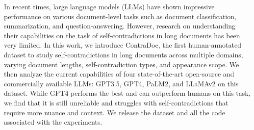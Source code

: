 In recent times, large language models (LLMs) have shown impressive performance on various document-level tasks such as document classification, summarization, and question-answering. However, research on understanding their capabilities on the task of self-contradictions in long documents has been very limited. In this work, we introduce ContraDoc, the first human-annotated dataset to study self-contradictions in long documents across multiple domains, varying document lengths, self-contradiction types, and appearance scope. We then analyze the current capabilities of four state-of-the-art open-source and commercially available LLMs: GPT3.5, GPT4, PaLM2, and LLaMAv2 on this dataset.  While GPT4 performs the best and can outperform humans on this task, we find that it is still unreliable and struggles with self-contradictions that require more nuance and context. We release the dataset and all the code associated with the experiments.